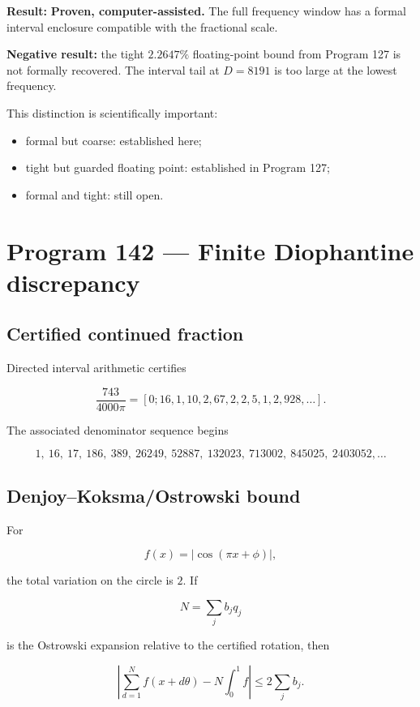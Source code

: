 \documentclass[11pt,a4paper,openany]{report}
\begin{document}
\textbf{Result:} \textbf{Proven, computer-assisted.} The full frequency window has a formal interval enclosure compatible with the fractional scale.

\textbf{Negative result:} the tight \(2.2647\%\) floating-point bound from Program 127 is not formally recovered. The interval tail at \(D=8191\) is too large at the lowest frequency.

This distinction is scientifically important:

\begin{itemize}
\item 
formal but coarse: established here;

\item 
tight but guarded floating point: established in Program 127;

\item 
formal and tight: still open.

\end{itemize}

\section{Program 142 --- Finite Diophantine discrepancy}

\subsection{Certified continued fraction}

Directed interval arithmetic certifies

\[
\frac{743}{4000\pi}
=
[0;16,1,10,2,67,2,2,5,1,2,928,\ldots].
\]

The associated denominator sequence begins

\[
1,\ 16,\ 17,\ 186,\ 389,\ 26249,\ 52887,\ 132023,\
713002,\ 845025,\ 2403052,\ldots
\]

\subsection{Denjoy--Koksma/\allowbreak{}Ostrowski bound}

For

\[
f(x)=|\cos(\pi x+\phi)|,
\]

the total variation on the circle is \(2\). If

\[
N=\sum_jb_jq_j
\]

is the Ostrowski expansion relative to the certified rotation, then

\[
\left|
\sum_{d=1}^N f(x+d\theta)
-N\int_0^1f
\right|
\le
2\sum_jb_j.
\]
\end{document}
